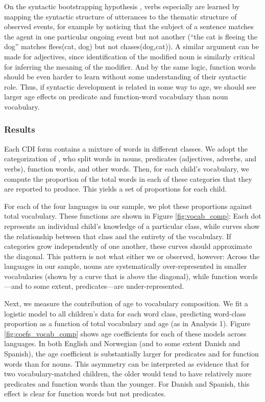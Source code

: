 \documentclass[10pt,letterpaper]{article}
\begin{document}
On the syntactic bootstrapping hypothesis \cite{gleitman1990,fisher2010}, verbs especially are learned by mapping the syntactic structure of utterances to the thematic structure of observed events, for example by noticing that the subject of a sentence matches the agent in one particular ongoing event but not another (``the cat is fleeing the dog'' matches {\sc flees(cat, dog)} but not {\sc chases(dog,cat)}). A similar argument can be made for adjectives, since identification of the modified noun is similarly critical for inferring the meaning of the modifier. And by the same logic, function words should be even harder to learn without some understanding of their syntactic role.   Thus, if syntactic development is related in some way to age, we should see larger age effects on predicate and function-word vocabulary than noun vocabulary. 

\subsubsection{Results}

Each CDI form contains a mixture of words in different classes. We adopt the categorization of , who split words in nouns, predicates (adjectives, adverbs, and verbs), function words, and other words. Then, for each child's vocabulary, we compute the proportion of the total words in each of these categories that they are reported to produce. This yields a set of proportions for each child.

For each of the four languages in our sample, we plot these proportions against total vocabulary. These functions are shown in Figure \ref{fig:vocab_comp}: Each dot represents an individual child's knowledge of a particular class, while curves show the relationship between that class and the entirety of the vocabulary. If categories grow independently of one another, these curves should approximate the diagonal. This pattern is not what either we or \citeauthor{bates1994} observed, however: Across the languages in our sample, nouns are systematically over-represented in smaller vocabularies (shown by a curve that is above the diagonal), while function words---and to some extent, predicates---are under-represented. 

Next, we measure the contribution of age to vocabulary composition. We fit a logistic model to all children's data for each word class, predicting word-class proportion as a function of total vocabulary and age (as in Analysis 1). Figure \ref{fig:coefs_vocab_comp} shows age coefficients for each of these models across languages. In both English and Norwegian (and to some extent Danish and Spanish), the age coefficient is substantially larger for predicates and for function words than for nouns. This asymmetry can be interpreted as evidence that for two vocabulary-matched children, the older would tend to have relatively more predicates and function words than the younger. For Danish and Spanish, this effect is clear for function words but not predicates.
\end{document}
